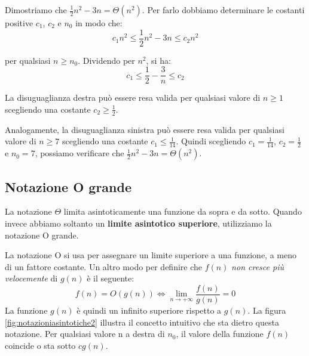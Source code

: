 \begin{example}
		Dimostriamo che $\frac{1}{2}n^{2}-3n = \Theta(n^{2})$.
	Per farlo dobbiamo determinare le costanti positive $c_{1}$, $c_{2}$ e $n_{0}$ in modo che:
	\begin{displaymath}
		c_{1}n^{2} \leq \frac{1}{2}n^{2}-3n \leq c_{2}n^{2}
	\end{displaymath}

	per qualsiasi $n \geq n_{0}$. Dividendo per $n^{2}$, si ha:
	\begin{displaymath}
		c_{1} \leq \frac{1}{2}-\frac{3}{n} \leq c_{2}
	\end{displaymath}

	La disuguaglianza destra può essere resa valida per qualsiasi valore di $n \geq 1$ scegliendo una costante $c_{2}\geq \frac{1}{2}$.

	Analogamente, la disuguaglianza sinistra può essere resa valida per qualsiasi valore di $n \geq 7$ scegliendo una costante $c_{1} \leq \frac{1}{14}$. Quindi scegliendo $c_{1}=\frac{1}{14}$, $c_{2}=\frac{1}{2}$ e $n_{0}=7$, possiamo verificare che $\frac{1}{2}n^{2}-3n = \Theta(n^{2})$.

\end{example}

\subsection{Notazione O grande}
La notazione $\Theta$ limita asintoticamente una funzione da sopra e da sotto. Quando invece abbiamo soltanto un \textbf{limite asintotico superiore}, utilizziamo la notazione O grande.

La notazione O si usa per assegnare un limite superiore a una funzione, a meno di un fattore costante. Un altro modo per definire che $f(n)$ \textit{non cresce più velocemente} di $g(n)$ è il seguente:
\begin{equation}
	f(n)=O(g(n)) \iff \lim_{n \to +\infty} \frac{f(n)}{g(n)}=0
\end{equation}
La funzione $g(n)$ è quindi un infinito superiore rispetto a $g(n)$. La figura \ref{fig:notazioniasintotiche2} illustra il concetto intuitivo che sta dietro questa notazione. Per qualsiasi valore n a destra di $n_{0}$, il valore della funzione $f(n)$ coincide o sta sotto $cg(n)$.


